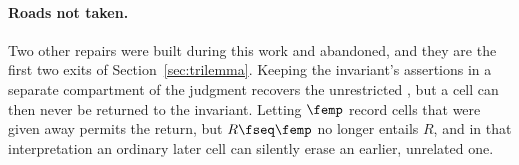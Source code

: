 \paragraph{Roads not taken.}
Two other repairs were built during this work and abandoned, and they are
the first two exits of Section~\ref{sec:trilemma}. Keeping the invariant's
assertions in a separate compartment of the judgment recovers the
unrestricted , but a cell can then never be returned to the
invariant. Letting $\femp$ record cells that were given away permits the
return, but $R \fseq \femp$ no longer entails $R$, and in that
interpretation an ordinary later cell can silently erase an earlier,
unrelated one.
